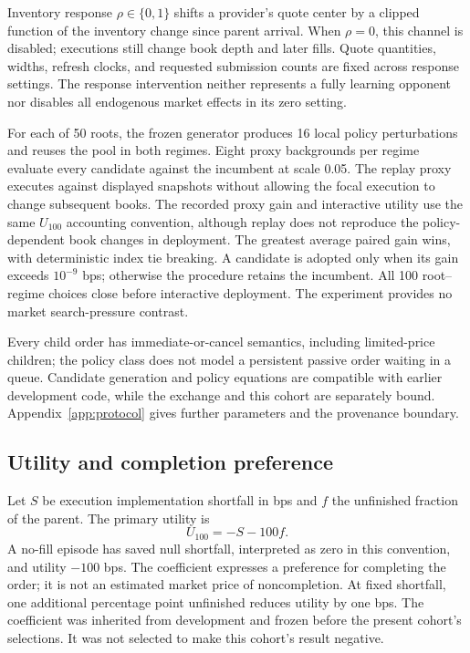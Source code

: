 \documentclass[10pt,letterpaper]{article}
\begin{document}
Inventory response $\rho\in\{0,1\}$ shifts a provider's quote center by a clipped function of the inventory change since parent arrival. When $\rho=0$, this channel is disabled; executions still change book depth and later fills. Quote quantities, widths, refresh clocks, and requested submission counts are fixed across response settings. The response intervention neither represents a fully learning opponent nor disables all endogenous market effects in its zero setting.

For each of 50 roots, the frozen generator produces 16 local policy perturbations and reuses the pool in both regimes. Eight proxy backgrounds per regime evaluate every candidate against the incumbent at scale 0.05. The replay proxy executes against displayed snapshots without allowing the focal execution to change subsequent books. The recorded proxy gain and interactive utility use the same $U_{100}$ accounting convention, although replay does not reproduce the policy-dependent book changes in deployment. The greatest average paired gain wins, with deterministic index tie breaking. A candidate is adopted only when its gain exceeds $10^{-9}$ bps; otherwise the procedure retains the incumbent. All 100 root--regime choices close before interactive deployment. The experiment provides no market search-pressure contrast.

Every child order has immediate-or-cancel semantics, including limited-price children; the policy class does not model a persistent passive order waiting in a queue. Candidate generation and policy equations are compatible with earlier development code, while the exchange and this cohort are separately bound. Appendix~\ref{app:protocol} gives further parameters and the provenance boundary.

\subsection{Utility and completion preference}
Let $S$ be execution implementation shortfall in bps and $f$ the unfinished fraction of the parent. The primary utility is
\begin{equation}
U_{100}=-S-100f.\label{eq:utility}
\end{equation}
A no-fill episode has saved null shortfall, interpreted as zero in this convention, and utility $-100$ bps. The coefficient expresses a preference for completing the order; it is not an estimated market price of noncompletion. At fixed shortfall, one additional percentage point unfinished reduces utility by one bps. The coefficient was inherited from development and frozen before the present cohort's selections. It was not selected to make this cohort's result negative.
\end{document}

